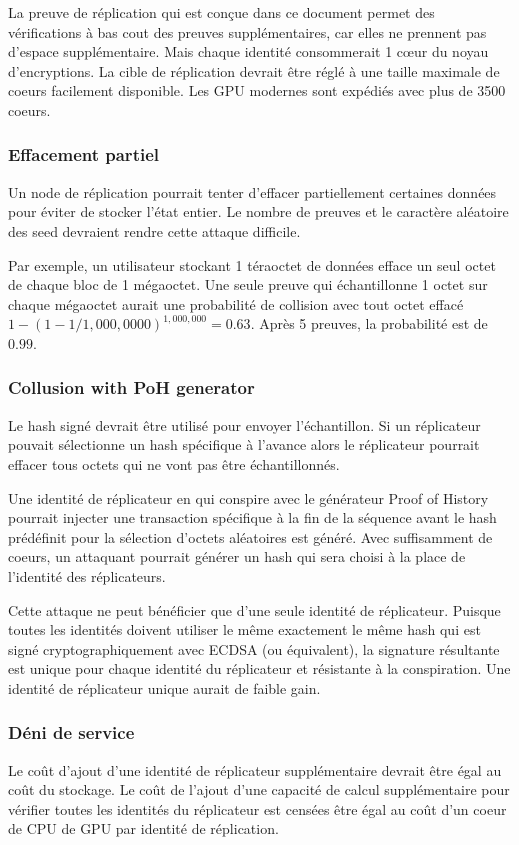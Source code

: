 \documentclass[12pt]{article}
\begin{document}
La preuve de réplication qui est conçue dans ce document permet des vérifications à bas cout des preuves supplémentaires, car elles ne prennent pas d'espace supplémentaire. Mais chaque identité consommerait 1 cœur du noyau d’encryptions. La cible de réplication devrait être réglé à une taille maximale de coeurs facilement disponible. Les GPU modernes sont expédiés avec plus de 3500 coeurs.

\subsubsection{Effacement partiel}

Un node de réplication pourrait tenter d'effacer partiellement certaines données pour éviter de stocker l'état entier. Le nombre de preuves et le caractère aléatoire des seed devraient rendre cette attaque difficile.

Par exemple, un utilisateur stockant 1 téraoctet de données efface un seul octet de chaque bloc de 1 mégaoctet. Une seule preuve qui échantillonne 1 octet sur chaque mégaoctet aurait une probabilité de collision avec tout octet effacé \(1 - (1- 1/1,000,0000)^{1,000,000} = 0.63\). Après 5 preuves, la probabilité est de \(0.99\).

\subsubsection{Collusion with PoH generator}

Le hash signé devrait être utilisé pour envoyer l'échantillon. Si un réplicateur pouvait sélectionne un hash spécifique à l'avance alors le réplicateur pourrait effacer tous octets qui ne vont pas être échantillonnés.

Une identité de réplicateur en qui conspire avec le générateur Proof of History pourrait injecter une transaction spécifique à la fin de la séquence avant le hash prédéfinit pour la sélection d'octets aléatoires est généré. Avec suffisamment de coeurs, un attaquant pourrait générer un hash qui sera choisi à la place de l’identité des réplicateurs.

Cette attaque ne peut bénéficier que d'une seule identité de réplicateur. Puisque toutes les identités doivent utiliser le même exactement le même hash qui est signé cryptographiquement avec ECDSA (ou équivalent), la signature résultante est unique pour chaque identité du réplicateur et résistante à la conspiration. Une identité de réplicateur unique aurait de faible gain.
\subsubsection{Déni de service}
Le coût d'ajout d'une identité de réplicateur supplémentaire devrait être égal au coût du stockage. Le coût de l'ajout d'une capacité de calcul supplémentaire pour vérifier toutes les identités du réplicateur est censées être égal au coût d'un coeur de CPU de GPU par identité de réplication.
\end{document}
